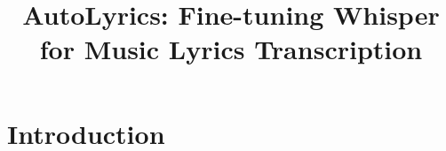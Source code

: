 \documentclass[conference]{IEEEtran}
\title{AutoLyrics: Fine-tuning Whisper for Music Lyrics Transcription}
\begin{document}
\maketitle
\section{Introduction}
\end{document}

